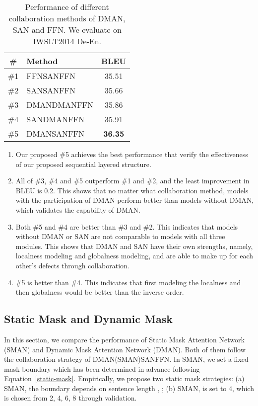 \documentclass[11pt]{article}
\begin{document}
\begin{table}
\begin{center}
\begin{tabular}{clc}
\midrule[1.0pt]
\# &Method &BLEU \\
\midrule[1.0pt]
\#1 & FFNSANFFN &35.51 \\
\#2 & SANSANFFN &35.66 \\
\#3 & DMANDMANFFN &35.86 \\
\#4 & SANDMANFFN &35.91 \\
\midrule[1.0pt]
\#5 & DMANSANFFN  & \textbf{36.35} \\
\midrule[1.0pt]
\end{tabular}
\end{center}
\caption{Performance of different collaboration methods of DMAN, SAN and FFN. We evaluate on IWSLT2014 De-En.}
\label{ablation-result}
\end{table}

\begin{enumerate}
    \item Our proposed  \#5 achieves the best performance that verify the effectiveness of our proposed sequential layered structure.
    \item All of \#3, \#4 and \#5 outperform \#1 and \#2, and the least improvement in BLEU is 0.2. This shows that no matter what collaboration method, models with the participation of DMAN perform better than models without DMAN, which validates the capability of DMAN.
    \item Both \#5 and \#4 are better than \#3 and \#2. This indicates that models without DMAN or SAN are not comparable to models with all three modules. This shows that DMAN and SAN have their own strengths, namely, localness modeling and globalness modeling, and are able to make up for each other's defects through collaboration.
    \item \#5 is better than \#4.
    This indicates that first modeling the localness and then globalness would be better than the inverse order.  
\end{enumerate}

\subsection{Static Mask and Dynamic Mask}
\label{Static_Mask_and_Dynamic_Mask}
In this section, we compare the performance of Static Mask Attention Network (SMAN) and Dynamic Mask Attention Network (DMAN). Both of them follow the collaboration strategy of DMAN(SMAN)SANFFN. 
In SMAN, we set a fixed mask boundary which has been determined in advance following Equation~\ref{static-mask}. Empirically, we propose two static mask strategies: (a) SMAN, the boundary  depends on sentence length , ; (b) SMAN,  is set to 4, which is chosen from 2, 4, 6, 8 through validation. 
\end{document}
